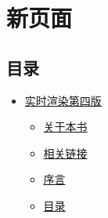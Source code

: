 \documentclass[
  paper=a4,
  ,captions=tableheading
]{scrartcl}
\author{}
\date{}
\title{}
\author{}
\date{}
\providecommand{\tightlist}{%
  \setlength{\itemsep}{0pt}\setlength{\parskip}{0pt}}
\begin{document}
\section{新页面}\label{ux65b0ux9875ux9762}

\subsection{目录}\label{ux76eeux5f55}

\begin{itemize}
\tightlist
\item
  \hyperref[ux5b9eux65f6ux6e32ux67d3ux7b2cux56dbux7248]{实时渲染第四版}

  \begin{itemize}
  \tightlist
  \item
    \hyperref[ux5173ux4e8eux672cux4e66]{关于本书}
  \item
    \hyperref[ux76f8ux5173ux94feux63a5]{相关链接}
  \item
    \hyperref[ux5e8fux8a00]{序言}
  \item
    \hyperref[ux76eeux5f55]{目录}


\end{itemize}
\end{itemize}
\end{document}
